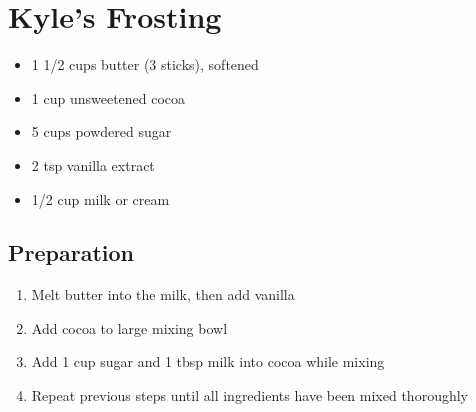 \documentclass{article}
\begin{document}
\section{Kyle's Frosting}



\begin{itemize}
\item 1 1/2 cups butter (3 sticks), softened
\item 1 cup unsweetened cocoa
\item 5 cups powdered sugar
\item 2 tsp vanilla extract
\item 1/2 cup milk or cream
\end{itemize}

\subsection{Preparation}

\begin{enumerate}
\item Melt butter into the milk, then add vanilla
\item Add cocoa to large mixing bowl
\item Add 1 cup sugar and 1 tbsp milk into cocoa while mixing
\item Repeat previous steps until all ingredients have been mixed thoroughly
\end{enumerate}
\end{document}
